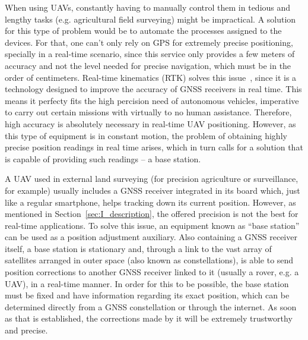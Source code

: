 When using UAVs, constantly having to manually control them in tedious and lengthy tasks (e.g. agricultural field surveying) might be impractical.
A solution for this type of problem would be to automate the processes assigned to the devices. For that, one can't only rely on GPS for extremely precise positioning, specially in a real-time scenario, since this service only provides a few meters of accuracy and not the level needed for precise navigation, which must be in the order of centimeters. Real-time kinematics (RTK) solves this issue~\cite{gps_USGov,8714161},
since it is a technology designed to improve the accuracy of GNSS receivers in real time. This means it perfecty fits the high percision need of autonomous vehicles, imperative to carry out certain missions with virtually to no human assistance. Therefore, high accuracy is absolutely necessary in real-time UAV positioning.
However, as this type of equipment is in constant motion, the problem of obtaining highly precise position readings in real time arises, which in turn calls for a solution that is capable of providing such readings -- a base station.

A UAV used in external land surveying (for precision agriculture or surveillance, for example) usually includes a GNSS receiver integrated in its board which, just like a regular smartphone, helps tracking down its current position.
However, as mentioned in Section~\ref{sec:I_description}, the offered precision is not the best for real-time applications.
To solve this issue, an equipment known as ``base station'' can be used as a position adjustment auxiliary.
Also containing a GNSS receiver itself, a base station is stationary and, through a link to the vast array of satellites arranged in outer space (also known as constellations), is able to send position corrections to another GNSS receiver linked to it (usually a rover, e.g. a UAV), in a real-time manner.
In order for this to be possible, the base station must be fixed and have information regarding its exact position, which can be determined directly from a GNSS constellation or through the internet.
As soon as that is established, the corrections made by it will be extremely trustworthy and precise.

